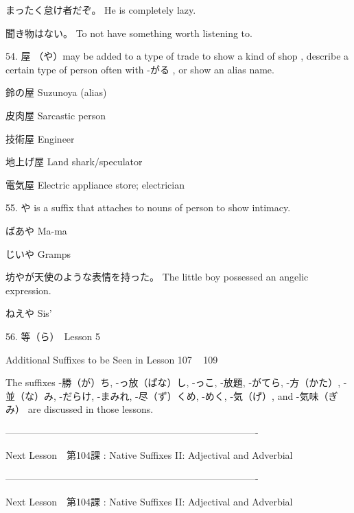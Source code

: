 \par{まったく怠け者だぞ。 \hfill\break
He is completely lazy. }

\par{聞き物はない。 \hfill\break
To not have something worth listening to. }

\par{54. 屋 （や）may be added to a type of trade to show a kind of shop , describe a certain type of person often with -がる , or show an alias name. }

\par{鈴の屋 \hfill\break
Suzunoya (alias) }

\par{皮肉屋 \hfill\break
Sarcastic person }

\par{技術屋 \hfill\break
Engineer }

\par{地上げ屋 \hfill\break
Land shark\slash speculator }

\par{電気屋 \hfill\break
Electric appliance store; electrician }

\par{55. や is a suffix that attaches to nouns of person to show intimacy. }

\par{ばあや \hfill\break
Ma-ma }

\par{じいや \hfill\break
Gramps }

\par{坊やが天使のような表情を持った。 \hfill\break
The little boy possessed an angelic expression. }

\par{ねえや \hfill\break
Sis' }

\par{56. 等（ら）　\textrightarrow  Lesson 5  \hfill\break
}

\par{Additional Suffixes to be Seen in Lesson 107  ~  109  }

\par{The suffixes -勝（が）ち, -っ放（ぱな）し, -っこ, -放題, -がてら, -方（かた）, -並（な）み, -だらけ, -まみれ, -尽（ず）くめ, -めく, -気（げ）, and -気味（ぎみ） are discussed in those lessons. }

\par{------------------------------------------------------------------------------- }

\par{Next Lesson　\textrightarrow  第104課 : Native Suffixes II: Adjectival and Adverbial  }

\par{------------------------------------------------------------------------------- }

\par{Next Lesson　\textrightarrow  第104課 : Native Suffixes II: Adjectival and Adverbial  }
    